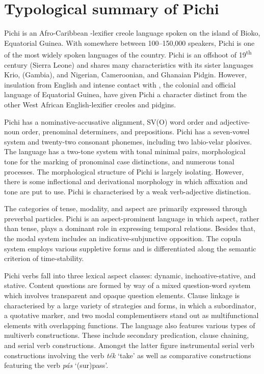 \chapter{Typological summary of Pichi}

Pichi is an Afro-Caribbean -lexifier creole language spoken on the island of Bioko, Equatorial Guinea. With somewhere between 100–150,000 speakers, Pichi is one of the most widely spoken languages of the country. Pichi is an offshoot of 19\textsuperscript{th} century  (Sierra Leone) and shares many characteristics with its sister languages Krio,  (Gambia), and Nigerian, Cameroonian, and Ghanaian Pidgin. However, insulation from English and intense contact with , the colonial and official language of Equatorial Guinea, have given Pichi a character distinct from the other West African English-lexifier creoles and pidgins. 


Pichi has a nominative-accusative alignment, SV(O) word order and adjective-noun order, prenominal determiners, and prepositions. Pichi has a seven-vowel system and twenty-two consonant phonemes, including two labio-velar plosives. The language has a two-tone system with tonal minimal pairs, morphological tone for the marking of pronominal case distinctions, and numerous tonal processes. The morphological structure of Pichi is largely isolating. However, there is some inflectional and derivational morphology in which affixation and tone are put to use. Pichi is characterised by a weak verb-adjective distinction. 



The categories of tense, modality, and aspect are primarily expressed through preverbal particles. Pichi is an aspect-prominent language in which aspect, rather than tense, plays a dominant role in expressing temporal relations. Besides that, the modal system includes an indicative-subjunctive opposition. The copula system employs various suppletive forms and is differentiated along the semantic criterion of time-stability.



Pichi verbs fall into three lexical aspect classes: dynamic, inchoative-stative, and stative. Content questions are formed by way of a mixed question-word system which involves transparent and opaque question elements. Clause linkage is characterised by a large variety of strategies and forms, in which a subordinator, a quotative marker, and two modal complementisers stand out as multifunctional elements with overlapping functions. The language also features various types of multiverb constructions. These include secondary predication, clause chaining, and serial verb constructions. Amongst the latter figure instrumental serial verb constructions involving the verb \textit{ték} ‘take’ as well as comparative constructions featuring the verb \textit{pás} ‘(sur)pass’. 



